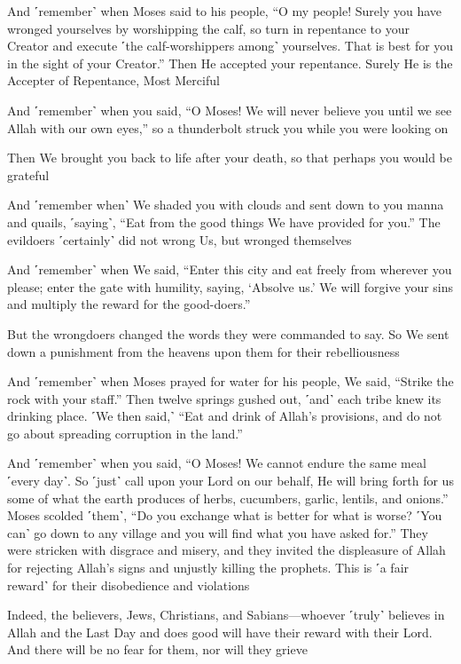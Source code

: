 And ˹remember˺ when Moses said to his people, “O my people! Surely you have wronged yourselves by worshipping the calf, so turn in repentance to your Creator and execute ˹the calf-worshippers among˺ yourselves. That is best for you in the sight of your Creator.” Then He accepted your repentance. Surely He is the Accepter of Repentance, Most Merciful

And ˹remember˺ when you said, “O Moses! We will never believe you until we see Allah with our own eyes,” so a thunderbolt struck you while you were looking on

Then We brought you back to life after your death, so that perhaps you would be grateful

And ˹remember when˺ We shaded you with clouds and sent down to you manna and quails, ˹saying˺, “Eat from the good things We have provided for you.” The evildoers ˹certainly˺ did not wrong Us, but wronged themselves

And ˹remember˺ when We said, “Enter this city and eat freely from wherever you please; enter the gate with humility, saying, ‘Absolve us.’ We will forgive your sins and multiply the reward for the good-doers.”

But the wrongdoers changed the words they were commanded to say. So We sent down a punishment from the heavens upon them for their rebelliousness

And ˹remember˺ when Moses prayed for water for his people, We said, “Strike the rock with your staff.” Then twelve springs gushed out, ˹and˺ each tribe knew its drinking place. ˹We then said,˺ “Eat and drink of Allah’s provisions, and do not go about spreading corruption in the land.”

And ˹remember˺ when you said, “O Moses! We cannot endure the same meal ˹every day˺. So ˹just˺ call upon your Lord on our behalf, He will bring forth for us some of what the earth produces of herbs, cucumbers, garlic, lentils, and onions.” Moses scolded ˹them˺, “Do you exchange what is better for what is worse? ˹You can˺ go down to any village and you will find what you have asked for.” They were stricken with disgrace and misery, and they invited the displeasure of Allah for rejecting Allah’s signs and unjustly killing the prophets. This is ˹a fair reward˺ for their disobedience and violations

Indeed, the believers, Jews, Christians, and Sabians—whoever ˹truly˺ believes in Allah and the Last Day and does good will have their reward with their Lord. And there will be no fear for them, nor will they grieve


